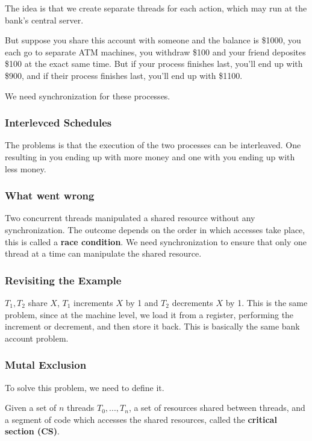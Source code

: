 \documentclass{article}
\begin{document}
The idea is that we create separate threads for each action, which may run at the bank's central server.

But suppose you share this account with someone and the balance is \$1000, you each go to separate ATM machines, you withdraw \$100 and your friend deposites \$100 at the exact same time. But if your process finishes last, you'll end up with \$900, and if their process finishes last, you'll end up with \$1100.

We need synchronization for these processes.

\subsubsection{Interlevced Schedules}

The problems is that the execution of the two processes can be interleaved. One resulting in you ending up with more money and one with you ending up with less money.

\subsubsection{What went wrong}

Two concurrent threads manipulated a shared resource without any synchronization. The outcome depends on the order in which accesses take place, this is called a \textbf{race condition}. We need synchronization to ensure that only one thread at a time can manipulate the shared resource.

\subsubsection{Revisiting the Example}

$T_1, T_2$ share $X$, $T_1$ increments $X$ by 1 and $T_2$ decrements $X$ by 1. This is the same problem, since at the machine level, we load it from a register, performing the increment or decrement, and then store it back. This is basically the same bank account problem.

\subsubsection{Mutal Exclusion}

To solve this problem, we need to define it.

Given a set of $n$ threads $T_0, ..., T_n$, a set of resources shared between threads, and a segment of code which accesses the shared resources, called the \textbf{critical section (CS)}.
\end{document}
